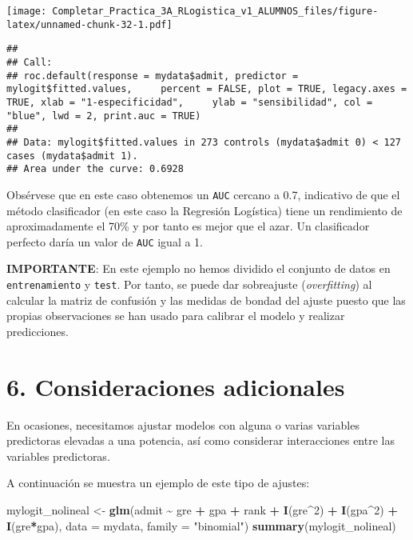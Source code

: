 \documentclass[
]{article}
\newenvironment{Shaded}{\begin{snugshade}}{\end{snugshade}}
\newcommand{\AttributeTok}[1]{\textcolor[rgb]{0.13,0.29,0.53}{#1}}
\newcommand{\DecValTok}[1]{\textcolor[rgb]{0.00,0.00,0.81}{#1}}
\newcommand{\FunctionTok}[1]{\textcolor[rgb]{0.13,0.29,0.53}{\textbf{#1}}}
\newcommand{\NormalTok}[1]{#1}
\newcommand{\OtherTok}[1]{\textcolor[rgb]{0.56,0.35,0.01}{#1}}
\newcommand{\SpecialCharTok}[1]{\textcolor[rgb]{0.81,0.36,0.00}{\textbf{#1}}}
\newcommand{\StringTok}[1]{\textcolor[rgb]{0.31,0.60,0.02}{#1}}
\begin{document}
\texttt{[image: Completar\_Practica\_3A\_RLogistica\_v1\_ALUMNOS\_files/figure-latex/unnamed-chunk-32-1.pdf]}

\begin{verbatim}
## 
## Call:
## roc.default(response = mydata$admit, predictor = mylogit$fitted.values,     percent = FALSE, plot = TRUE, legacy.axes = TRUE, xlab = "1-especificidad",     ylab = "sensibilidad", col = "blue", lwd = 2, print.auc = TRUE)
## 
## Data: mylogit$fitted.values in 273 controls (mydata$admit 0) < 127 cases (mydata$admit 1).
## Area under the curve: 0.6928
\end{verbatim}

Obsérvese que en este caso obtenemos un \texttt{AUC} cercano a 0.7,
indicativo de que el método clasificador (en este caso la Regresión
Logística) tiene un rendimiento de aproximadamente el 70\% y por tanto
es mejor que el azar. Un clasificador perfecto daría un valor de
\texttt{AUC} igual a 1.

\textbf{IMPORTANTE}: En este ejemplo no hemos dividido el conjunto de
datos en \texttt{entrenamiento} y \texttt{test}. Por tanto, se puede dar
sobreajuste (\emph{overfitting}) al calcular la matriz de confusión y
las medidas de bondad del ajuste puesto que las propias observaciones se
han usado para calibrar el modelo y realizar predicciones.

\hypertarget{consideraciones-adicionales}{%
\section{6. Consideraciones
adicionales}\label{consideraciones-adicionales}}

En ocasiones, necesitamos ajustar modelos con alguna o varias variables
predictoras elevadas a una potencia, así como considerar interacciones
entre las variables predictoras.

A continuación se muestra un ejemplo de este tipo de ajustes:

\begin{Shaded}
\begin{Highlighting}[]
\NormalTok{mylogit\_nolineal }\OtherTok{\textless{}{-}} \FunctionTok{glm}\NormalTok{(admit }\SpecialCharTok{\textasciitilde{}}\NormalTok{ gre }\SpecialCharTok{+}\NormalTok{ gpa }\SpecialCharTok{+}\NormalTok{ rank }\SpecialCharTok{+} \FunctionTok{I}\NormalTok{(gre}\SpecialCharTok{\^{}}\DecValTok{2}\NormalTok{) }\SpecialCharTok{+} \FunctionTok{I}\NormalTok{(gpa}\SpecialCharTok{\^{}}\DecValTok{2}\NormalTok{) }\SpecialCharTok{+} \FunctionTok{I}\NormalTok{(gre}\SpecialCharTok{*}\NormalTok{gpa),}
                        \AttributeTok{data =}\NormalTok{ mydata, }\AttributeTok{family =} \StringTok{"binomial"}\NormalTok{)}
\FunctionTok{summary}\NormalTok{(mylogit\_nolineal)}
\end{Highlighting}
\end{Shaded}
\end{document}
